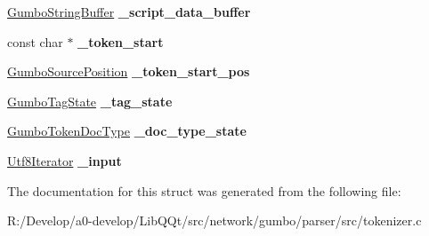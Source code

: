 \begin{DoxyCompactItemize}
\item 
\mbox{\label{struct_gumbo_internal_tokenizer_state_a60344af245ae4066032ca4c0280a8288}} 
\mbox{\hyperlink{struct_gumbo_string_buffer}{Gumbo\+String\+Buffer}} {\bfseries \+\_\+script\+\_\+data\+\_\+buffer}
\item 
\mbox{\label{struct_gumbo_internal_tokenizer_state_a4e7ac19c22e15122e29f0d81793d7b1a}} 
const char $\ast$ {\bfseries \+\_\+token\+\_\+start}
\item 
\mbox{\label{struct_gumbo_internal_tokenizer_state_aaeb2b3f9324af83af26beb16adbb8179}} 
\mbox{\hyperlink{struct_gumbo_source_position}{Gumbo\+Source\+Position}} {\bfseries \+\_\+token\+\_\+start\+\_\+pos}
\item 
\mbox{\label{struct_gumbo_internal_tokenizer_state_a48bd97d3a124e60c40120168420443c8}} 
\mbox{\hyperlink{struct_gumbo_internal_tag_state}{Gumbo\+Tag\+State}} {\bfseries \+\_\+tag\+\_\+state}
\item 
\mbox{\label{struct_gumbo_internal_tokenizer_state_a139884be06718f80a2266c04ae510dfe}} 
\mbox{\hyperlink{struct_gumbo_internal_token_doc_type}{Gumbo\+Token\+Doc\+Type}} {\bfseries \+\_\+doc\+\_\+type\+\_\+state}
\item 
\mbox{\label{struct_gumbo_internal_tokenizer_state_ab3f769a4d1f48846b4791b17a8f0864f}} 
\mbox{\hyperlink{struct_gumbo_internal_utf8_iterator}{Utf8\+Iterator}} {\bfseries \+\_\+input}
\end{DoxyCompactItemize}


The documentation for this struct was generated from the following file\+:\begin{DoxyCompactItemize}
\item 
R\+:/\+Develop/a0-\/develop/\+Lib\+Q\+Qt/src/network/gumbo/parser/src/tokenizer.\+c\end{DoxyCompactItemize}

